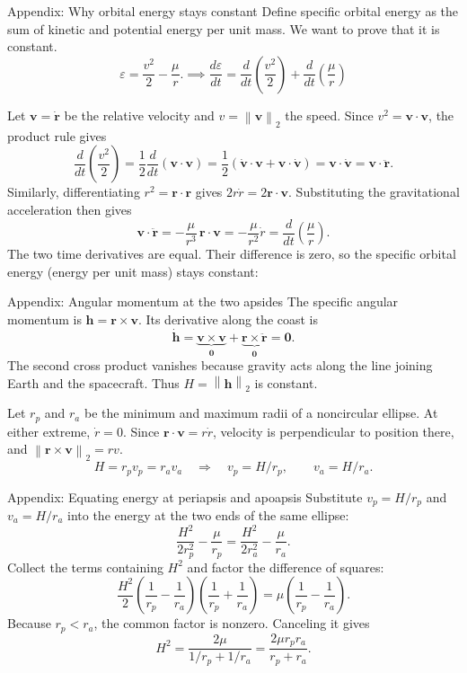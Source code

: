 \documentclass[aspectratio=43,10pt]{beamer}
\newcommand{\R}{\mathbf r}
\newcommand{\V}{\mathbf v}
\newcommand{\norm}[1]{\left\lVert #1\right\rVert}
\begin{document}
\appendix
\begin{frame}{Appendix: Why orbital energy stays constant}
Define specific orbital energy as the sum of kinetic and potential energy per unit mass. We want to prove that it is constant.
\[
 \varepsilon=\frac{v^2}{2}-\frac{\mu}{r}.
\implies
 \frac{d\varepsilon}{dt}=\frac{d}{dt}(\frac{v^2}{2})+\frac{d}{dt}(\frac{\mu}{r})
\]

Let $\V=\dot{\R}$ be the relative velocity and $v=\norm{\V}_2$ the speed. Since $v^2=\V\cdot\V$, the product rule gives
\[
 \frac{d}{dt}\left(\frac{v^2}{2}\right)
 =\frac12\frac{d}{dt}(\V\cdot\V)
 =\frac12(\dot{\V}\cdot\V+\V\cdot\dot{\V})
 =\V\cdot\dot{\V}
 =\V\cdot\ddot{\R}.
\]
Similarly, differentiating $r^2=\R\cdot\R$ gives $2r\dot r=2\R\cdot\V$. Substituting the gravitational acceleration then gives
\[
 \V\cdot\ddot{\R}
 =-\frac{\mu}{r^3}\,\R\cdot\V
 =-\frac{\mu}{r^2}\dot r
 =\frac{d}{dt}\!\left(\frac{\mu}{r}\right).
\]
The two time derivatives are equal. Their difference is zero, so the specific orbital energy (energy per unit mass) stays constant:
\end{frame}

\begin{frame}{Appendix: Angular momentum at the two apsides}
The specific angular momentum is $\mathbf h=\R\times\V$. Its derivative along the coast is
\[
 \dot{\mathbf h}=\underbrace{\V\times\V}_{\mathbf 0}
 +\underbrace{\R\times\ddot{\R}}_{\mathbf 0}=\mathbf 0 .
\]
The second cross product vanishes because gravity acts along the line joining Earth and the spacecraft. Thus $H=\norm{\mathbf h}_2$ is constant.
\medskip

Let $r_p$ and $r_a$ be the minimum and maximum radii of a noncircular ellipse. At either extreme, $\dot r=0$. Since $\R\cdot\V=r\dot r$, velocity is perpendicular to position there, and $\norm{\R\times\V}_2=rv$.
\[
 H=r_p v_p=r_a v_a
 \quad\Longrightarrow\quad
 v_p=H/r_p,\qquad v_a=H/r_a .
\]
\end{frame}

\begin{frame}{Appendix: Equating energy at periapsis and apoapsis}
Substitute $v_p=H/r_p$ and $v_a=H/r_a$ into the energy at the two ends of the same ellipse:
\[
 \frac{H^2}{2r_p^2}-\frac{\mu}{r_p}
 =\frac{H^2}{2r_a^2}-\frac{\mu}{r_a}.
\]
Collect the terms containing $H^2$ and factor the difference of squares:
\[
 \frac{H^2}{2}
 \left(\frac{1}{r_p}-\frac{1}{r_a}\right)
 \left(\frac{1}{r_p}+\frac{1}{r_a}\right)
 =\mu\left(\frac{1}{r_p}-\frac{1}{r_a}\right).
\]
Because $r_p<r_a$, the common factor is nonzero. Canceling it gives
\[
 H^2=\frac{2\mu}{1/r_p+1/r_a}
 =\frac{2\mu r_p r_a}{r_p+r_a}.
\]
\end{frame}
\end{document}
